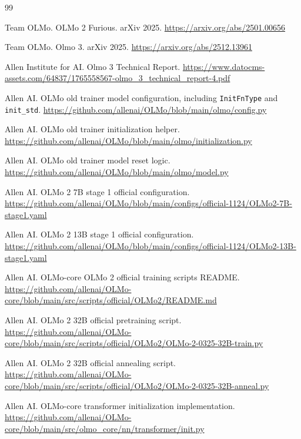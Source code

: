 \documentclass[UTF8,a4paper,11pt]{ctexart}
\begin{document}
\begin{thebibliography}{99}

Team OLMo.
 OLMo 2 Furious.
\newblock arXiv 2025.
\newblock \url{https://arxiv.org/abs/2501.00656}

Team OLMo.
\newblock Olmo 3.
\newblock arXiv 2025.
\newblock \url{https://arxiv.org/abs/2512.13961}

Allen Institute for AI.
\newblock Olmo 3 Technical Report.
\newblock \url{https://www.datocms-assets.com/64837/1765558567-olmo_3_technical_report-4.pdf}

Allen AI.
\newblock OLMo old trainer model configuration, including \texttt{InitFnType} and \texttt{init\_std}.
\newblock \url{https://github.com/allenai/OLMo/blob/main/olmo/config.py}

Allen AI.
\newblock OLMo old trainer initialization helper.
\newblock \url{https://github.com/allenai/OLMo/blob/main/olmo/initialization.py}

Allen AI.
\newblock OLMo old trainer model reset logic.
\newblock \url{https://github.com/allenai/OLMo/blob/main/olmo/model.py}

Allen AI.
\newblock OLMo 2 7B stage 1 official configuration.
\newblock \url{https://github.com/allenai/OLMo/blob/main/configs/official-1124/OLMo2-7B-stage1.yaml}

Allen AI.
\newblock OLMo 2 13B stage 1 official configuration.
\newblock \url{https://github.com/allenai/OLMo/blob/main/configs/official-1124/OLMo2-13B-stage1.yaml}

Allen AI.
\newblock OLMo-core OLMo 2 official training scripts README.
\newblock \url{https://github.com/allenai/OLMo-core/blob/main/src/scripts/official/OLMo2/README.md}

Allen AI.
\newblock OLMo 2 32B official pretraining script.
\newblock \url{https://github.com/allenai/OLMo-core/blob/main/src/scripts/official/OLMo2/OLMo-2-0325-32B-train.py}

Allen AI.
\newblock OLMo 2 32B official annealing script.
\newblock \url{https://github.com/allenai/OLMo-core/blob/main/src/scripts/official/OLMo2/OLMo-2-0325-32B-anneal.py}

Allen AI.
\newblock OLMo-core transformer initialization implementation.
\newblock \url{https://github.com/allenai/OLMo-core/blob/main/src/olmo_core/nn/transformer/init.py}


\end{thebibliography}
\end{document}
